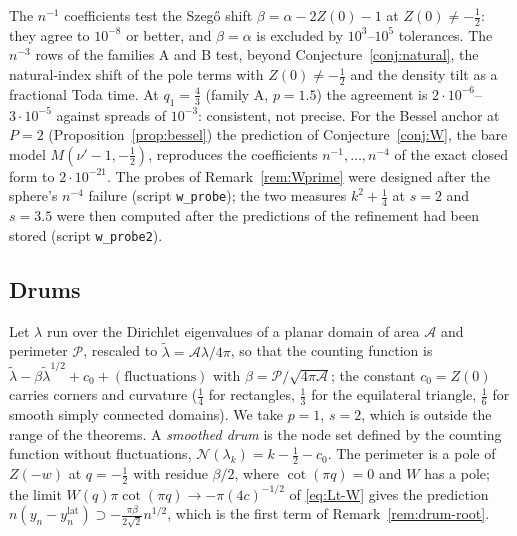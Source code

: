The $n^{-1}$ coefficients test the Szeg\H{o} shift $\beta=\alpha-2Z(0)-1$ at $Z(0)\ne-\frac12$: they agree to $10^{-8}$ or better, and $\beta=\alpha$
is excluded by $10^3$--$10^5$ tolerances. The $n^{-3}$ rows of the families A and B test, beyond Conjecture~\ref{conj:natural}, the natural-index
shift of the pole terms with $Z(0)\ne-\frac12$ and the density tilt as a fractional Toda time. At $q_1=\frac43$ (family A, $p=1.5$) the agreement
is $2\cdot10^{-6}$--$3\cdot10^{-5}$ against spreads of $10^{-3}$: consistent, not precise. For the Bessel anchor at $P=2$
(Proposition~\ref{prop:bessel}) the prediction of Conjecture~\ref{conj:W}, the bare model $M(\nu'-1,-\frac12)$, reproduces the coefficients
$n^{-1},\dots,n^{-4}$ of the exact closed form to $2\cdot10^{-21}$. The probes of Remark~\ref{rem:Wprime} were designed after the sphere's
$n^{-4}$ failure (script \texttt{w\_probe}); the two measures $k^2+\frac14$ at $s=2$ and $s=3.5$ were then computed after the predictions of the
refinement had been stored (script \texttt{w\_probe2}).

\subsection{Drums}\label{sec:drums}
Let $\lambda$ run over the Dirichlet eigenvalues of a planar domain of area $\mathcal A$ and perimeter $\mathcal P$,
rescaled to $\tilde\lambda=\mathcal A\lambda/4\pi$, so that the counting function is
$\tilde\lambda-\beta\tilde\lambda^{1/2}+c_0+(\text{fluctuations})$ with $\beta=\mathcal P/\sqrt{4\pi\mathcal A}$; the
constant $c_0=Z(0)$ carries corners and curvature ($\frac14$ for rectangles, $\frac13$ for the equilateral triangle,
$\frac16$ for smooth simply connected domains). We take $p=1$, $s=2$, which is outside the range of the theorems. A
\emph{smoothed drum} is the node set defined by the counting function without fluctuations, $\mathcal N(\lambda_k)=k-\frac12-c_0$.
The perimeter is a pole of $Z(-w)$ at $q=-\frac12$ with residue $\beta/2$, where $\cot(\pi q)=0$ and $W$ has a pole; the
limit $W(q)\pi\cot(\pi q)\to-\pi(4c)^{-1/2}$ of \eqref{eq:Lt-W} gives the prediction
$n(y_n-y_n^{\mathrm{lat}})\supset-\frac{\pi\beta}{2\sqrt2}n^{1/2}$, which is the first term of Remark~\ref{rem:drum-root}.

